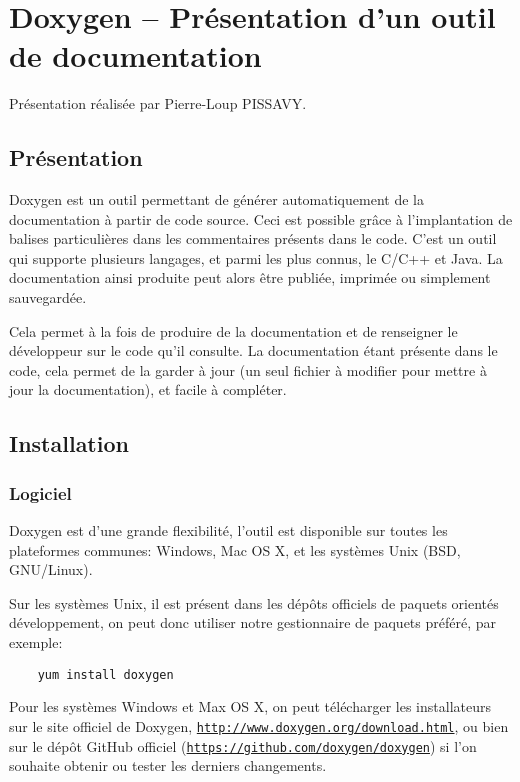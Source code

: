 \chapter{Doxygen -- Présentation d'un outil de documentation}
Présentation réalisée par Pierre-Loup PISSAVY.
\section{Présentation}

  Doxygen est un outil permettant de générer automatiquement de la documentation à partir de code source. Ceci est possible grâce à l'implantation de balises particulières dans les commentaires présents dans le code.
  C'est un outil qui supporte plusieurs langages, et parmi les plus connus, le C/C++ et Java. La documentation ainsi produite peut alors être publiée, imprimée ou simplement sauvegardée.

  Cela permet à la fois de produire de la documentation et de renseigner le développeur sur le code qu'il consulte. La documentation étant présente dans le code, cela permet de la garder à jour (un seul fichier à modifier pour mettre à jour la documentation), et facile à compléter.

\section{Installation}
\subsection{Logiciel}
  Doxygen est d'une grande flexibilité, l'outil est disponible sur toutes les plateformes communes: Windows, Mac OS X, et les systèmes Unix (BSD, GNU/Linux).

  Sur les systèmes Unix, il est présent dans les dépôts officiels de paquets orientés développement, on peut donc utiliser notre gestionnaire de paquets préféré, par exemple:
  \begin{verbatim}
    yum install doxygen
  \end{verbatim}

  Pour les systèmes Windows et Max OS X, on peut télécharger les installateurs sur le site officiel de Doxygen,
  \href{http://www.doxygen.org/download.html}{\texttt{http://www.doxygen.org/download.html}},
  ou bien sur le dépôt GitHub officiel (\href{https://github.com/doxygen/doxygen}{\texttt{https://github.com/doxygen/doxygen}})
  si l'on souhaite obtenir ou tester les derniers changements.

